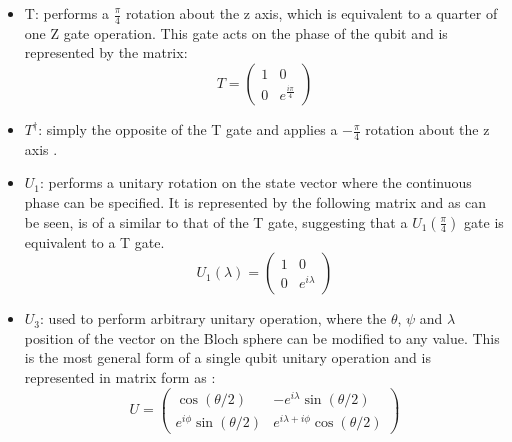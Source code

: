 \documentclass{article}
\begin{document}
\begin{itemize}[labelindent=1.5em,labelsep=0.9cm,leftmargin=*]
	\item{} {} {} {} {}  T: performs a $\frac{\pi}{4}$ rotation about the z axis, which is equivalent to a quarter of one Z gate operation. This gate acts on the phase of the qubit and is represented by the matrix: 
\[T=\left(\begin{array}{ll}{1} & {0} \\ {0} & {e^\frac{i\pi}{4}}\end{array}\right)\]
	\item{} {} {} {} {}  $T^\dagger$: simply the opposite of the T gate and applies a $-\frac{\pi}{4}$ rotation about the z axis \cite{qiskitt}.
	\item{} {} {} {} {}  $U_1$: performs a unitary rotation on the state vector where the continuous phase can be specified. It is represented by the following matrix and as can be seen, is of a similar to that of the T gate, suggesting that a $U_1(\frac{\pi}{4})$ gate is equivalent to a T gate.
	\[U_1(\lambda) = \left(\begin{array}{ll}{1} & {0} \\ {0} & {e^{i \lambda}}\end{array}\right)\]
	\item{}  {} {} {} {} $U_3$: used to perform arbitrary unitary operation, where the $\theta$, $\psi$ and $\lambda$ position of the vector on the Bloch sphere can be modified to any value. This is the most general form of a single qubit unitary operation and is represented in matrix form as \cite{qiskitu}:
	\[U=\left(\begin{array}{cc}{\cos (\theta / 2)} & {-e^{i \lambda} \sin (\theta / 2)} \\ {e^{i \phi} \sin (\theta / 2)} & {e^{i \lambda+i \phi} \cos (\theta / 2)}\end{array}\right)\]

\end{itemize}
\end{document}

